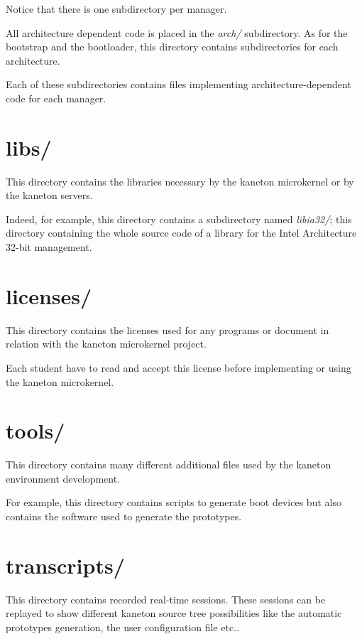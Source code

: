 Notice that there is one subdirectory per manager.

All architecture dependent code is placed in the \textit{arch/} subdirectory.
As for the bootstrap and the bootloader, this directory contains
subdirectories for each architecture.

Each of these subdirectories contains files implementing
architecture-dependent code for each manager.

%
%

\section{libs/}

This directory contains the libraries necessary by the kaneton microkernel
or by the kaneton servers.

Indeed, for example, this directory contains a subdirectory named
\textit{libia32/}; this directory containing the whole source code of
a library for the Intel Architecture 32-bit management.

%
%

\section{licenses/}

This directory contains the licenses used for any programs or document
in relation with the kaneton microkernel project.

Each student have to read and accept this license before implementing
or using the kaneton microkernel.

%
%

\section{tools/}

This directory contains many different additional files used by
the kaneton environment development.

For example, this directory contains scripts to generate boot devices
but also contains the software used to generate the prototypes.

%
%

\section{transcripts/}

This directory contains recorded real-time sessions. These sessions
can be replayed to show different kaneton source tree possibilities
like the automatic prototypes generation, the user configuration file
etc..

